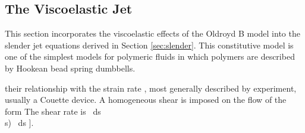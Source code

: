 \documentclass[11pt]{article}
\begin{document}
\subsection{The Viscoelastic Jet}
This section incorporates the viscoelastic effects of the Oldroyd B model 
\citep{oldroyd1950formulation} into the slender jet equations derived in 
Section \ref{sec:slender}. This constitutive model is one of the simplest 
models for polymeric fluids in which polymers are described by Hookean bead 
spring dumbbells.

their relationship with the strain rate \cite{goldin1969breakup}, most 
generally described by
%
experiment, usually a Couette device. A homogeneous shear is imposed on the 
flow  of the form
The shear rate is 
\, ds \\
\omega s) \, ds \right].
\end{document}
